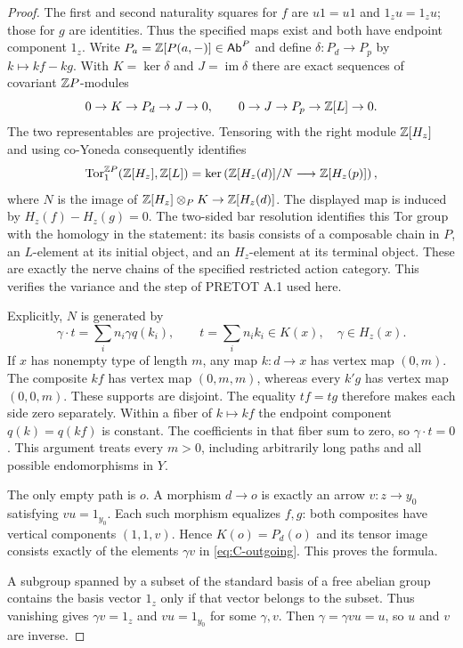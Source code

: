 \begin{proof}
The first and second naturality squares for $f$ are
$u1=u1$ and $1_zu=1_zu$; those for $g$ are identities. Thus the
specified maps exist and both have endpoint component $1_z$.
Write $P_a=\mathbb Z[P(a,-)]\in\mathsf{Ab}^P$ and define
$\delta:P_d\to P_p$ by $k\mapsto kf-kg$. With
$K=\ker\delta$ and $J=\operatorname{im}\delta$ there are exact
sequences of covariant $\mathbb Z P$-modules
\[
 0\to K\to P_d\to J\to0,
 \qquad 0\to J\to P_p\to\mathbb Z[L]\to0.
\]
The two representables are projective. Tensoring with the right module
$\mathbb Z[H_z]$ and using co-Yoneda consequently identifies
\[
 \operatorname{Tor}^{\mathbb Z P}_1(\mathbb Z[H_z],\mathbb Z[L])
 =\ker\left(\mathbb Z[H_z(d)]/N\longrightarrow\mathbb Z[H_z(p)]\right),
\]
where $N$ is the image of
$\mathbb Z[H_z]\otimes_P K\to\mathbb Z[H_z(d)]$.
The displayed map is induced by $H_z(f)-H_z(g)=0$.
The two-sided bar resolution identifies this Tor group with the
homology in the statement: its basis consists of a composable chain
in $P$, an $L$-element at its initial object, and an $H_z$-element
at its terminal object. These are exactly the nerve chains of the
specified restricted action category. This verifies the variance and
the step of PRETOT A.1 used here.

Explicitly, $N$ is generated by
\[
 \gamma\cdot t=\sum_i n_i\gamma q(k_i),\qquad
 t=\sum_i n_i k_i\in K(x),\quad \gamma\in H_z(x).
\]
If $x$ has nonempty type of length $m$, any map $k:d\to x$
has vertex map $(0,m)$. The composite $kf$ has vertex map
$(0,m,m)$, whereas every $k'g$ has vertex map $(0,0,m)$.
These supports are disjoint. The equality $tf=tg$ therefore makes
each side zero separately. Within a fiber of $k\mapsto kf$ the
endpoint component $q(k)=q(kf)$ is constant. The coefficients in
that fiber sum to zero, so $\gamma\cdot t=0$.
This argument treats every $m>0$, including arbitrarily long paths
and all possible endomorphisms in $Y$.

The only empty path is $o$. A morphism $d\to o$ is exactly an
arrow $v:z\to y_0$ satisfying $vu=1_{y_0}$. Each such morphism
equalizes $f,g$: both composites have vertical components
$(1,1,v)$. Hence $K(o)=P_d(o)$ and its tensor image consists
exactly of the elements $\gamma v$ in \eqref{eq:C-outgoing}.
This proves the formula.

A subgroup spanned by a subset of the standard basis of a free
abelian group contains the basis vector $1_z$ only if that vector
belongs to the subset. Thus vanishing gives $\gamma v=1_z$ and
$vu=1_{y_0}$ for some $\gamma,v$. Then
$\gamma=\gamma vu=u$, so $u$ and $v$ are inverse.
\end{proof}

